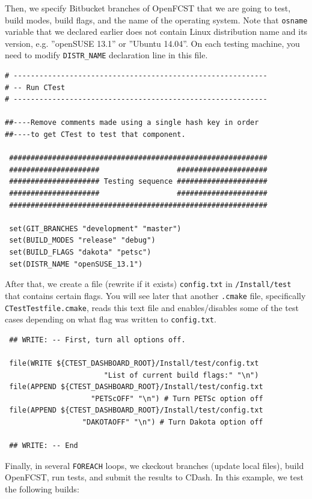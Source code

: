 Then, we specify Bitbucket branches of OpenFCST that we are going to test, build modes, build flags, and the name of the operating system. Note that \verb!osname! variable that we declared earlier does not contain Linux distribution name and its version, e.g. ''openSUSE 13.1'' or ''Ubuntu 14.04''. On each testing machine, you need to modify \verb!DISTR_NAME! declaration line in this file.

\small \begin{lstlisting}
# -----------------------------------------------------------  
# -- Run CTest
# -----------------------------------------------------------  

##----Remove comments made using a single hash key in order
##----to get CTest to test that component.

 ############################################################
 #####################                  #####################
 ##################### Testing sequence #####################
 #####################                  #####################
 ############################################################ 

 set(GIT_BRANCHES "development" "master")
 set(BUILD_MODES "release" "debug")
 set(BUILD_FLAGS "dakota" "petsc")
 set(DISTR_NAME "openSUSE_13.1")

\end{lstlisting}\normalsize

After that, we create a file (rewrite if it exists) \verb!config.txt! in \verb!/Install/test! that contains certain flags. You will see later that another \verb!.cmake! file, specifically \verb!CTestTestfile.cmake!, reads this text file and enables/disables some of the test cases depending on what flag was written to \verb!config.txt!.

\small \begin{lstlisting}
 ## WRITE: -- First, turn all options off.

 file(WRITE ${CTEST_DASHBOARD_ROOT}/Install/test/config.txt
                       "List of current build flags:" "\n")
 file(APPEND ${CTEST_DASHBOARD_ROOT}/Install/test/config.txt
                    "PETScOFF" "\n") # Turn PETSc option off
 file(APPEND ${CTEST_DASHBOARD_ROOT}/Install/test/config.txt
                  "DAKOTAOFF" "\n") # Turn Dakota option off

 ## WRITE: -- End
\end{lstlisting}\normalsize

Finally, in several \verb!FOREACH! loops, we ckeckout branches (update local files), build OpenFCST, run tests, and submit the results to CDash. In this example, we test the following builds:

